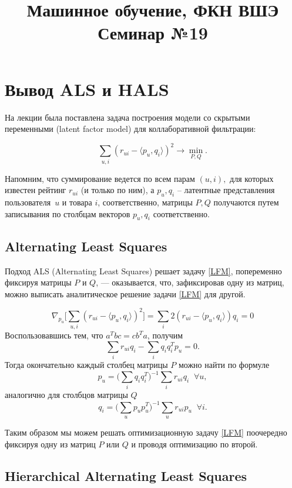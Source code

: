 \documentclass[12pt,a4paper]{article}
\title{Машинное обучение, ФКН ВШЭ\\Семинар №19}
\author{}
\date{}
\begin{document}
\maketitle

\section{Вывод ALS и HALS}

На лекции была поставлена задача построения модели со скрытыми переменными (latent factor model) для коллаборативной фильтрации:

\[
	\sum_{u,i} (r_{ui} - \langle p_u, q_i \rangle)^2 \to \min_{P,Q}.
\label{LFM}
\]

Напомним, что суммирование ведется по всем парам $(u, i),$ для которых известен рейтинг $r_{ui}$ (и только по ним), а $p_u, q_i$ – латентные представления пользователя~$u$ и товара $i$, соответственно, матрицы $P, Q$ получаются путем записывания по столбцам векторов $p_u, q_i$ соответственно.

\subsection{Alternating Least Squares}

Подход ALS (Alternating Least Squares) решает задачу \eqref{LFM}, попеременно фиксируя матрицы $P$ и $Q$, — оказывается, что, зафиксировав одну из матриц, можно выписать аналитическое решение задачи \eqref{LFM} для другой.

\[
	\nabla_{p_u} \bigg[ \sum_{u,i} (r_{ui} - \langle p_u, q_i \rangle)^2 \bigg] = \sum_{i} 2(r_{ui} - \langle p_u, q_i \rangle)q_i = 0
\]
Воспользовавшись тем, что $a^Tbc = cb^Ta$, получим
\[
	\sum_{i} r_{ui}q_i - \sum_i q_i q_i^T p_u = 0.
\]
Тогда окончательно каждый столбец матрицы $P$ можно найти по формуле
\[
	p_u = \bigg( \sum_i q_i q_i^T\bigg)^{-1}\sum_ir_{ui}q_i \;\; \forall u,
\]
аналогично для столбцов матрицы $Q$
\[
	q_i = \bigg( \sum_u p_u p_u^T\bigg)^{-1}\sum_ur_{ui}p_u \;\; \forall i.
\]

Таким образом мы можем решать оптимизационную задачу \eqref{LFM} поочередно фиксируя одну из матриц $P$ или $Q$ и проводя оптимизацию по второй.

\subsection{Hierarchical Alternating Least Squares}
\end{document}
